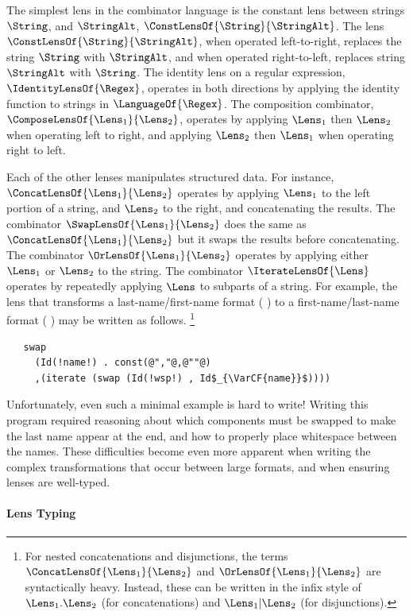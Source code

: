 \documentclass[acmsmall,screen]{acmart}
\begin{document}
The simplest lens in the combinator language is the constant lens between
strings $\String$, and $\StringAlt$, $\ConstLensOf{\String}{\StringAlt}$.
The lens $\ConstLensOf{\String}{\StringAlt}$, when operated left-to-right,
replaces the string $\String$ with $\StringAlt$, and when operated
right-to-left, replaces string $\StringAlt$ with $\String$.  The identity lens
on a regular expression, $\IdentityLensOf{\Regex}$, operates in both
directions by applying the
identity function to strings in $\LanguageOf{\Regex}$.  The composition
combinator, 
$\ComposeLensOf{\Lens_1}{\Lens_2}$, operates by applying $\Lens_1$ then $\Lens_2$
when operating left to right, and applying $\Lens_2$ then $\Lens_1$ when
operating right to left.

Each of the other lenses manipulates structured data.  For instance,
$\ConcatLensOf{\Lens_1}{\Lens_2}$ operates by applying $\Lens_1$ to the left
portion of a string, and $\Lens_2$ to the right, and concatenating the results.
The combinator
$\SwapLensOf{\Lens_1}{\Lens_2}$ does the same as $\ConcatLensOf{\Lens_1}{\Lens_2}$
but it swaps the results before concatenating.
The combinator $\OrLensOf{\Lens_1}{\Lens_2}$ operates by applying either $\Lens_1$ or $\Lens_2$
to the string.  The combinator $\IterateLensOf{\Lens}$ operates by repeatedly
applying $\Lens$ to subparts of a string.
For example, the lens that transforms a last-name/first-name format (\EG{}
) to a first-name/last-name format (\EG{}
) may be written as follows.
\footnote{For nested concatenations and disjunctions, the terms
  $\ConcatLensOf{\Lens_1}{\Lens_2}$ and $\OrLensOf{\Lens_1}{\Lens_2}$ are
  syntactically heavy.  Instead, these can be written in the infix style
  of $\Lens_1 . \Lens_2$ (for concatenations) and $\Lens_1 | \Lens_2$ (for disjunctions).}
%
\begin{lstlisting}
   swap
     (Id(!name!) . const(@","@,@""@)
     ,(iterate (swap (Id(!wsp!) , Id$_{\VarCF{name}}$))))
\end{lstlisting}
%
Unfortunately, even such a minimal example is hard to write!  Writing this
program required reasoning about which components must be swapped to make the
last name 
appear at the end, and how to properly place
whitespace between the names.  These difficulties become even more apparent when
writing the complex transformations that occur between large formats, and
when ensuring lenses are well-typed. 

\paragraph{Lens Typing}
\end{document}
